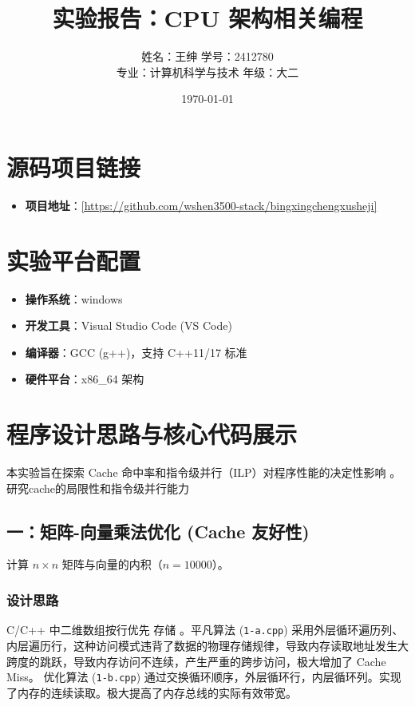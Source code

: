 \documentclass[12pt,a4paper]{ctexart}
\title{\textbf{实验报告：CPU 架构相关编程}}
\author{
    姓名：王绅 \quad 学号：2412780 \\
    专业：计算机科学与技术 \quad 年级：大二
}
\date{\today}
\begin{document}
\maketitle

\section{源码项目链接}

\begin{itemize}
    \item \textbf{项目地址}：\url{[https://github.com/wshen3500-stack/bingxingchengxusheji]}
\end{itemize}

\section{实验平台配置}
\begin{itemize}
    \item \textbf{操作系统}：windows
    \item \textbf{开发工具}：Visual Studio Code (VS Code) 
    \item \textbf{编译器}：GCC (g++)，支持 C++11/17 标准
    \item \textbf{硬件平台}：x86\_64 架构
\end{itemize}

\section{程序设计思路与核心代码展示}
本实验旨在探索 Cache 命中率和指令级并行（ILP）对程序性能的决定性影响 。研究cache的局限性和指令级并行能力

\subsection{一：矩阵-向量乘法优化 (Cache 友好性)}
计算 $n \times n$ 矩阵与向量的内积（$n=10000$）。

\subsubsection{设计思路}
C/C++ 中二维数组按行优先  存储 。平凡算法 (\texttt{1-a.cpp}) 采用外层循环遍历列、内层遍历行，这种访问模式违背了数据的物理存储规律，导致内存读取地址发生大跨度的跳跃，导致内存访问不连续，产生严重的跨步访问，极大增加了 Cache Miss。
优化算法 (\texttt{1-b.cpp}) 通过交换循环顺序，外层循环行，内层循环列。实现了内存的连续读取。极大提高了内存总线的实际有效带宽。
\end{document}
